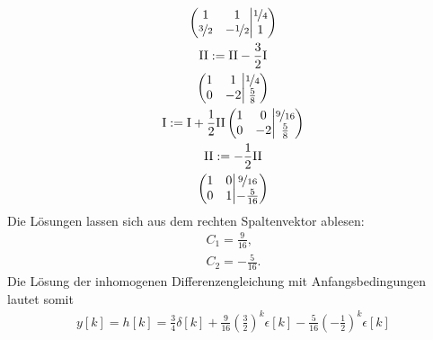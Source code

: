 \documentclass[11pt,a4paper,DIV=12]{scrartcl}
\begin{document}
\begin{gather}
	\left\lparen\begin{matrix}
		1 & 1 \\
		\nicefrac{3}{2} & -\nicefrac{1}{2}
	\end{matrix}
	\middle\vert
	\begin{matrix}
		\nicefrac{1}{4}\\
		1
	\end{matrix}\right\rparen\\
\mathrm{II}:=\mathrm{II}-\frac{3}{2}\mathrm{I}\\
	\left\lparen\begin{matrix}
		1 & 1 \\
		0 & -2
	\end{matrix}
	\middle\vert
	\begin{matrix}
		\nicefrac{1}{4}\\
		\frac{5}{8}
\end{matrix}\right\rparen\\
\mathrm{I}:=\mathrm{I}+\frac{1}{2}\mathrm{II}
	\left\lparen\begin{matrix}
		1 & 0 \\
		0 & -2
	\end{matrix}
	\middle\vert
	\begin{matrix}
		\nicefrac{9}{16}\\
		\frac{5}{8}
	\end{matrix}\right\rparen\\
\mathrm{II}:=-\frac{1}{2}\mathrm{II}\\
	\left\lparen\begin{matrix}
		1 & 0 \\
		0 & 1
	\end{matrix}
	\middle\vert
	\begin{matrix}
		\nicefrac{9}{16}\\
		-\frac{5}{16}
	\end{matrix}\right\rparen
\end{gather}
Die Lösungen lassen sich aus dem rechten Spaltenvektor ablesen:
\begin{gather}
	C_1=\frac{9}{16},\nonumber \\
	C_2=-\frac{5}{16}.\nonumber
\end{gather}
Die Lösung der inhomogenen Differenzengleichung mit Anfangsbedingungen lautet somit
\begin{gather}
	y[k]=h[k]=\frac{3}{4}\delta[k]+\frac{9}{16}\left(\frac{3}{2}\right)^k\epsilon[k]-\frac{5}{16}\left(-\frac{1}{2}\right)^k\epsilon[k]
\end{gather}
\newpage
\end{document}
